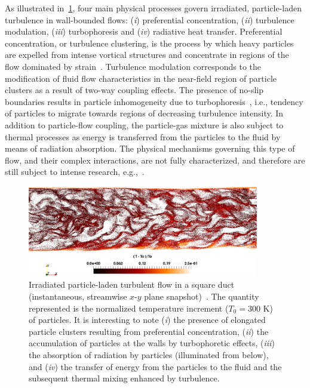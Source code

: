 As illustrated in~\cref{fig:irradiated_particle_laden_turbulent_flow}, four main physical processes govern irradiated, particle-laden turbulence in wall-bounded flows: (\emph{i}) preferential concentration, (\emph{ii}) turbulence modulation, (\emph{iii}) turbophoresis and (\emph{iv}) radiative heat transfer.
Preferential concentration, or turbulence clustering, is the process by which heavy particles are expelled from intense vortical structures and concentrate in regions of the flow dominated by strain~\citep{Balachandar2010-A}.
Turbulence modulation corresponds to the modification of fluid flow characteristics in the near-field region of particle clusters as a result of two-way coupling effects.
The presence of no-slip boundaries results in particle inhomogeneity due to turbophoresis~\citep{Caporaloni1975-A}, i.e., tendency of particles to migrate towards regions of decreasing turbulence intensity.
In addition to particle-flow coupling, the particle-gas mixture is also subject to thermal processes as energy is transferred from the particles to the fluid by means of radiation absorption.
The physical mechanisms governing this type of flow, and their complex interactions, are not fully characterized, and therefore are still subject to intense research, e.g.,~\citep{Zamansky2014-A,Frankel2016-A,Pouransari2017-A}.

\begin{figure}[!ht]
  \centering
  \includegraphics[width=0.9\textwidth]{fig/applications/psaap/irradiated_particle_laden_turbulence_duct.pdf}  
  \caption{Irradiated particle-laden turbulent flow in a square duct (instantaneous, streamwise $x$-$y$ plane snapshot)~\citep{Jofre2017-A}. The quantity represented is the normalized temperature increment ($T_{0}=300$ K) of particles. It is interesting to note (\emph{i}) the presence of elongated particle clusters resulting from preferential concentration, (\emph{ii}) the accumulation of particles at the walls by turbophoretic effects, (\emph{iii}) the absorption of radiation by particles (illuminated from below), and (\emph{iv}) the transfer of energy from the particles to the fluid and the subsequent thermal mixing enhanced by turbulence.}      \label{fig:irradiated_particle_laden_turbulent_flow}
\end{figure}

